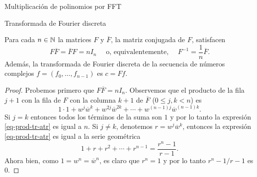 \begin{chapter}{Multiplicación de polinomios por FFT}
\begin{section}{Transformada de Fourier discreta}
        \begin{teorema}
            Para cada $n \in \mathbb N$ la matrices $F$ y $\overline{F}$, la matriz conjugada de $F$,   satisfacen
            \begin{equation*}
                F \overline{F} = \overline{F}F = nI_n\quad\text{ o,  equivalentemente, }\quad F^{-1} = \frac{1}{n}  \overline{F}.  
            \end{equation*}
            Además, la transformada de Fourier discreta de la secuencia de números complejos $f = (f_0,\ldots,f_{n-1})$ es $c = {F}f$.
        \end{teorema}
        \begin{proof}
            Probemos primero que $F \overline{F} = nI_n$. Observemos que el producto de la fila $j + 1 $ con la fila de $F$ con la columna $k +  1$ de $\overline{F}$  ($0 \le j, k < n$) es 
            \begin{equation}\label{eq-prod-tr-atr}
                1\cdot1 + w^j\overline{w}^k + w^{2j}\overline{w}^{2k} + \cdots +  w^{(n-1)j}\overline{w}^{(n-1)k}. 
            \end{equation}
            Si $j=k$  entonces todos los términos de la suma son $1$ y por lo tanto  la expresión \ref{eq-prod-tr-atr} es igual a $n$. Si $j \not= k$,
            denotemos $r =  w^j\overline{w}^k$,  entonces la expresión \ref{eq-prod-tr-atr} es igual a la serie geométrica
            \begin{equation*}
                1 +  r + r^2+ \cdots +r^{n-1} = \frac{r^n -1}{r -1}.
            \end{equation*}
            Ahora bien, como $1 = w^n = \overline{w}^n$, es claro que $r^n = 1$ y  por lo tanto $r^n -1/r -1$ es $0$. 


\end{proof}
\end{section}
\end{chapter}
